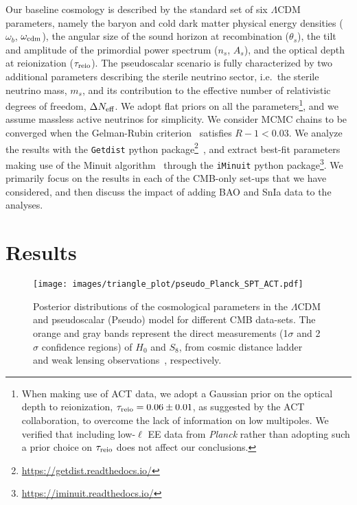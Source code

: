 \documentclass[a4paper,11pt]{article}
\begin{document}
Our baseline cosmology is described by the standard set of six $\Lambda$CDM parameters, namely the baryon and cold dark matter physical energy densities ($\omega_b$, $\omega_{\rm{cdm}}$), the angular size of the sound horizon at recombination ($\theta_s$), the tilt and amplitude of the primordial power spectrum ($n_s$, $A_s$), and the optical depth at reionization ($\tau_{\rm{reio}}$). The pseudoscalar scenario is fully characterized by two additional parameters describing the sterile neutrino sector, i.e.~the sterile neutrino mass, $m_s$, and its contribution to the effective number of relativistic degrees of freedom, $\Delta N_{\rm eff}$.
We adopt flat priors on all the parameters\footnote{When making use of ACT data, we adopt a Gaussian prior on the optical depth to reionization, $\tau_{\rm reio} = 0.06 \pm 0.01$, as suggested by the ACT collaboration, to overcome the lack of information on low multipoles. We verified that including low-$\ell$ EE data from \textit{Planck} rather than adopting such a prior choice on $\tau_{\rm reio}$ does not affect our conclusions.}, and we assume massless active neutrinos {for simplicity}.
We consider MCMC chains to be converged when the Gelman-Rubin criterion~\cite{Gelman:1992zz} satisfies $R-1<0.03$.
We analyze the results with the \texttt{Getdist} python package\footnote{\url{https://getdist.readthedocs.io/}}~\cite{Lewis:2019xzd}, and extract best-fit parameters making use of the {\texttt{}{Minuit}} algorithm~\cite{JAMES1975343} through the {\texttt{iMinuit}} python package\footnote{\url{https://iminuit.readthedocs.io/}}.
We primarily focus on the results in each of the CMB-only set-ups that we have considered, and then discuss the impact of adding BAO and SnIa data to the analyses.



\section{Results}\label{sec:results}


\begin{figure}[ht]
 \centering
   \texttt{[image: images/triangle\_plot/pseudo\_Planck\_SPT\_ACT.pdf]} %
  \caption{Posterior distributions of the cosmological parameters in the $\Lambda$CDM and pseudoscalar (Pseudo) model for different CMB data-sets. The orange and gray bands represent the direct measurements (1$\sigma$ and 2$\sigma$ confidence regions) of $H_0$ and $S_8$, from cosmic distance ladder~\cite{Riess:2020fzl} and weak lensing observations~\cite{Gatti:2021uwl}, respectively.
  }
  \label{Fig:pseudo_LCDM_Planck_SPT_ACT}
\end{figure}
\end{document}
